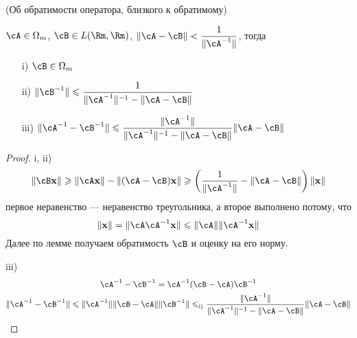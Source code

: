 \begin{theorem}(Об обратимости оператора, близкого к обратимому)

    $\displaystyle \cA \in \O_m$, $\displaystyle \cB \in L(\Rm, \Rm)$,
    $\displaystyle \norm{\cA - \cB} < \frac{1}{\norm{\cA^{-1}}}$, тогда

    \begin{itemize}
        \item[i)] $\cB \in \O_m$
        \item[ii)] $\displaystyle \norm{\cB^{-1}} \leqslant \frac{1}{\norm{\cA^{-
        1}}^{-1} - \norm{\cA - \cB}}$
        \item[iii)] $\displaystyle \norm{\cA^{-1} - \cB^{-1}} \leqslant
        \frac{\norm{\cA^{-1}}}{\norm{\cA^{-1}}^{-1} - \norm{\cA - \cB}}\norm{\cA
        - \cB}$
    \end{itemize}
\end{theorem}
\begin{proof}
    \item[i, ii)]
\[
    \norm{\cB \x} \geqslant \norm{\cA \x} - \norm{(\cA - \cB)\x} \geqslant
    \left( \frac{1}{\norm{\cA^{-1}}} - \norm{\cA - \cB} \right)\norm{\x}
\]
    первое неравенство --- неравенство треугольника, а второе выполнено потому,
    что
\[
    \norm{\x} = \norm{\cA \cA^{-1} \x} \leqslant \norm{\cA} \norm{\cA^{-1} \x}
\]
    Далее по лемме получаем обратимость $\cB$ и оценку на его норму.
    \item[iii)]
    \begin{gather*}
        \cA^{-1} - \cB^{-1} = \cA^{-1}(\cB - \cA)\cB^{-1} \\
        \norm{\cA^{-1} - \cB^{-1}} \leqslant \norm{\cA^{-1}} \norm{\cB - \cA}
        \norm{\cB^{-1}} \leqslant_{\text{i)}} \frac{\norm{\cA^{-1}}}{\norm{\cA^{-
        1}}^{-1} - \norm{\cA - \cB}}\norm{\cA - \cB}
    \end{gather*}
\end{proof}
